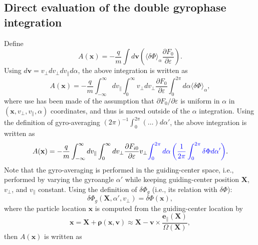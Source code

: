 \documentclass{article}
\newcommand{\tmcolor}[2]{{\color{#1}{#2}}}
\newcommand{\tmmathbf}[1]{\ensuremath{\boldsymbol{#1}}}
\begin{document}
\subsection{Direct evaluation of the double gyrophase integration}

Define
\begin{equation}
  A (\mathbf{x}) = - \frac{q}{m} \int d\mathbf{v} \left( \langle \delta \Phi
  \rangle_{\alpha} \frac{\partial F_0}{\partial \varepsilon} \right) .
\end{equation}
Using $d \mathbf{v} = v_{\perp} d v_{\perp} d v_{\parallel} d \alpha$, the
above integration is written as
\begin{equation}
  A (\mathbf{x}) = - \frac{q}{m} \int_{- \infty}^{\infty} d v_{\parallel}
  \int_0^{\infty} v_{\perp} d v_{\perp} \frac{\partial F_0}{\partial
  \varepsilon} \int_0^{2 \pi} d \alpha \langle \delta \Phi \rangle_{\alpha},
\end{equation}
where use has been made of the assumption that $\partial F_0 / \partial
\varepsilon$ is uniform in $\alpha$ in $(\mathbf{x}, v_{\perp}, v_{\parallel},
\alpha)$ coordinates, and thus is moved outside of the $\alpha$ integration.
Using the definition of gyro-averaging $(2 \pi)^{- 1} \int_0^{2 \pi} (\ldots)
d \alpha'$, the above integration is written as
\begin{equation}
  \label{21-8-22-e1} A (\mathbf{x}) = - \frac{q}{m} \int_{- \infty}^{\infty} d
  v_{\parallel} \int_0^{\infty} d v_{\perp} \frac{\partial F_{i 0}}{\partial
  \varepsilon} v_{\perp} \tmcolor{blue}{\int_0^{2 \pi} d \alpha \left(
  \frac{1}{2 \pi} \int_0^{2 \pi} \delta \Phi d \alpha' \right)} .
\end{equation}
Note that the gyro-averaging is performed in the guiding-center space, i.e.,
performed by varying the gyroangle $\alpha'$ while keeping guiding-center
position $\mathbf{X}$, $v_{\perp}$, and $v_{\parallel}$ constant. Using the
definition of $\delta \Phi_g$ (i.e., its relation with $\delta \Phi$):
\begin{equation}
  \delta \Phi_g (\mathbf{X}, \alpha', v_{\perp}) = \delta \Phi (\mathbf{x}),
\end{equation}
where the particle location $\tmmathbf{x}$ is computed from the guiding-center
location by
\begin{equation}
  \mathbf{x}=\mathbf{X}+\tmmathbf{\rho} (\mathbf{x}, \mathbf{v}) \approx
  \mathbf{X}-\mathbf{v} \times \frac{\mathbf{e}_{\parallel}
  (\mathbf{X})}{\Omega (\mathbf{X})},
\end{equation}
then $A (\mathbf{x})$ is written as
\end{document}
